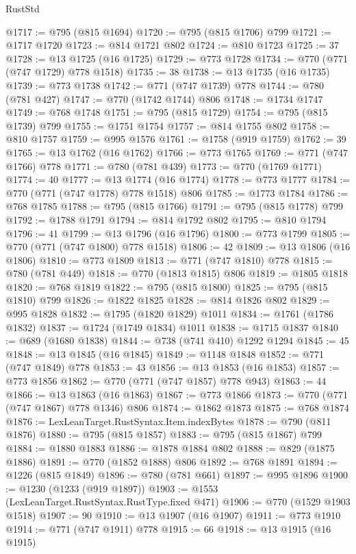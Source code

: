 \begin{lexlean}{RustStd}
\begin{coremodule}
@1717 := @795 (@815 @1694)
@1720 := @795 (@815 @1706) @799
@1721 := @1717 @1720
@1723 := @814 @1721 @802
@1724 := @810 @1723
@1725 := 37
@1728 := @13 @1725 (@16 @1725)
@1729 := @773 @1728
@1734 := @770 (@771 (@747 @1729) @778 @1518)
@1735 := 38
@1738 := @13 @1735 (@16 @1735)
@1739 := @773 @1738
@1742 := @771 (@747 @1739) @778
@1744 := @780 (@781 @427)
@1747 := @770 (@1742 @1744) @806
@1748 := @1734 @1747
@1749 := @768 @1748
@1751 := @795 (@815 @1729)
@1754 := @795 (@815 @1739) @799
@1755 := @1751 @1754
@1757 := @814 @1755 @802
@1758 := @810 @1757
@1759 := @995 @1576
@1761 := @1758 (@919 @1759)
@1762 := 39
@1765 := @13 @1762 (@16 @1762)
@1766 := @773 @1765
@1769 := @771 (@747 @1766) @778
@1771 := @780 (@781 @439)
@1773 := @770 (@1769 @1771)
@1774 := 40
@1777 := @13 @1774 (@16 @1774)
@1778 := @773 @1777
@1784 := @770 (@771 (@747 @1778) @778 @1518) @806
@1785 := @1773 @1784
@1786 := @768 @1785
@1788 := @795 (@815 @1766)
@1791 := @795 (@815 @1778) @799
@1792 := @1788 @1791
@1794 := @814 @1792 @802
@1795 := @810 @1794
@1796 := 41
@1799 := @13 @1796 (@16 @1796)
@1800 := @773 @1799
@1805 := @770 (@771 (@747 @1800) @778 @1518)
@1806 := 42
@1809 := @13 @1806 (@16 @1806)
@1810 := @773 @1809
@1813 := @771 (@747 @1810) @778
@1815 := @780 (@781 @449)
@1818 := @770 (@1813 @1815) @806
@1819 := @1805 @1818
@1820 := @768 @1819
@1822 := @795 (@815 @1800)
@1825 := @795 (@815 @1810) @799
@1826 := @1822 @1825
@1828 := @814 @1826 @802
@1829 := @995 @1828
@1832 := @1795 (@1820 @1829) @1011
@1834 := @1761 (@1786 @1832)
@1837 := @1724 (@1749 @1834) @1011
@1838 := @1715 @1837
@1840 := @689 (@1680 @1838)
@1844 := @738 (@741 @410) @1292 @1294
@1845 := 45
@1848 := @13 @1845 (@16 @1845)
@1849 := @1148 @1848
@1852 := @771 (@747 @1849) @778
@1853 := 43
@1856 := @13 @1853 (@16 @1853)
@1857 := @773 @1856
@1862 := @770 (@771 (@747 @1857) @778 @943)
@1863 := 44
@1866 := @13 @1863 (@16 @1863)
@1867 := @773 @1866
@1873 := @770 (@771 (@747 @1867) @778 @1346) @806
@1874 := @1862 @1873
@1875 := @768 @1874
@1876 := LexLeanTarget.RustSyntax.Item.indexBytes
@1878 := @790 (@811 @1876)
@1880 := @795 (@815 @1857)
@1883 := @795 (@815 @1867) @799
@1884 := @1880 @1883
@1886 := @1878 @1884 @802
@1888 := @829 (@1875 @1886)
@1891 := @770 (@1852 @1888) @806
@1892 := @768 @1891
@1894 := @1226 (@815 @1849)
@1896 := @780 (@781 @661)
@1897 := @995 @1896
@1900 := @1230 (@1233 (@919 @1897))
@1903 := @1553 (LexLeanTarget.RustSyntax.RustType.fixed @471)
@1906 := @770 (@1529 @1903 @1518)
@1907 := 90
@1910 := @13 @1907 (@16 @1907)
@1911 := @773 @1910
@1914 := @771 (@747 @1911) @778
@1915 := 66
@1918 := @13 @1915 (@16 @1915)

\end{coremodule}
\end{lexlean}
